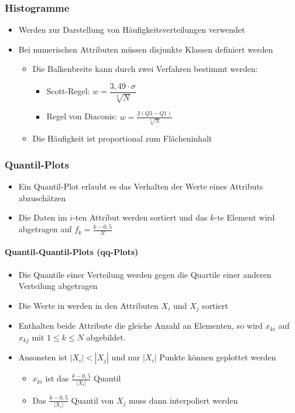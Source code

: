 \documentclass{scrartcl}
\begin{document}
\subsubsection{Histogramme}

\begin{itemize}
	\item Werden zur Darstellung von Häufigkeitsverteilungen verwendet
	\item Bei numerischen Attributen müssen disjunkte Klassen definiert werden
	\begin{itemize}
		\item Die Balkenbreite kann durch zwei Verfahren bestimmt werden:
		\begin{itemize}
			\item Scott-Regel: $ w = \dfrac{3,49 \cdot \sigma}{\sqrt[3]{N}} $
			\item Regel von Diaconis: $ w = \frac{2(Q3-Q1)}{\sqrt[3]{N}} $
		\end{itemize}
		\item Die Häufigkeit ist proportional zum Flächeninhalt
	\end{itemize}
\end{itemize}

\subsubsection{Quantil-Plots}

\begin{itemize}
	\item Ein Quantil-Plot erlaubt es das Verhalten der Werte eines Attributs 
	abzuschätzen
	\item Die Daten im $ i $-ten Attribut werden sortiert und das $ k $-te 
	Element wird abgetragen auf $ f_k = \frac{k-0,5}{N} $
\end{itemize}

\paragraph{Quantil-Quantil-Plots (qq-Plots)}

\begin{itemize}
	\item Die Quantile einer Verteilung werden gegen die Quartile einer anderen 
	Verteilung abgetragen
	\item Die Werte in werden in den Attributen $ X_i $ und $ X_j $ sortiert
	\item Enthalten beide Attribute die gleiche Anzahl an Elementen, so wird $ 
	x_{ki} $ auf $ x_{kj} $ mit $ 1 \leq k \leq N $ abgebildet.
	\item Ansonsten ist $ |X_i| < |X_j| $ und nur $ |X_i| $ Punkte können 
	geplottet werden
	\begin{itemize}
		\item $ x_{ki} $ ist das $ \frac{k-0,5}{|X_i|} $ Quantil
		\item Das $ \frac{k-0,5}{|X_i|} $ Quantil von $ X_j $ muss dann 
		interpoliert werden
	\end{itemize}
\end{itemize}
\end{document}
